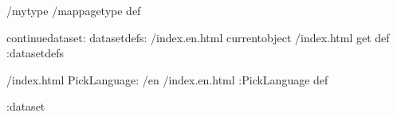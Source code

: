 \begin{ingrid}
/mytype /mappagetype def

continuedataset:
datasetdefs:
/index.en.html currentobject /index.html get def
:datasetdefs

/index.html {
PickLanguage:
/en /index.en.html
:PickLanguage
} def

:dataset

\end{ingrid}
~               
